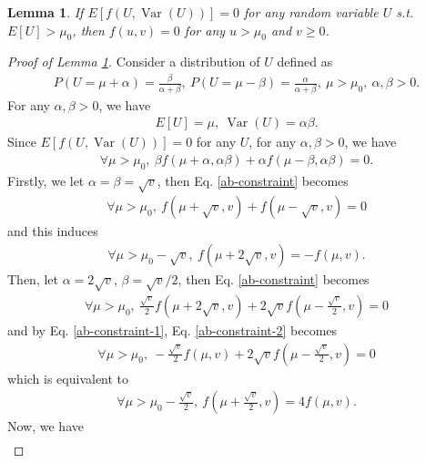 \documentclass[11pt]{article}
\theoremstyle{referenceplain}
\newtheorem{lemma}{Lemma}[section]
\theoremstyle{referencedefinition}
\theoremstyle{referenceremark}
\begin{document}
\begin{lemma}\label{lem: linear constraint}
    If $E[f(U,\operatorname{Var} (U))] = 0$ for any random variable $U$ s.t. $E[U]> \mu_0$, then $f(u,v) = 0$ for any $u>\mu_0$ and $v\ge 0$.
\end{lemma}
\begin{proof}[Proof of Lemma \ref{lem: linear constraint}]
    Consider a distribution of $U$ defined as 
    \begin{align*}
        P(U = \mu+\alpha) = \frac{\beta}{\alpha+\beta},~P(U = \mu-\beta) = \frac{\alpha}{\alpha+\beta},~\mu>\mu_0,~\alpha,\beta>0.
    \end{align*}
    For any $\alpha,\beta>0$, we have
    \begin{align*}
        E[U] = \mu,~\operatorname{Var}(U)=\alpha\beta.
    \end{align*}
    Since $E[f(U,\operatorname{Var} (U))] = 0$ for any $U$, for any $\alpha,\beta>0$, we have
    \begin{align}\label{ab-constraint}
       \forall\mu>\mu_0,~ \beta f(\mu+\alpha,\alpha\beta)+\alpha f(\mu-\beta,\alpha\beta)=0.
    \end{align}
    Firstly, we let $\alpha=\beta=\sqrt{v}$, then Eq. \eqref{ab-constraint} becomes
    \begin{align}
          \forall\mu>\mu_0,~  f(\mu+\sqrt{v},v)+f(\mu-\sqrt{v},v)=0
    \end{align}
    and this induces
    \begin{align}\label{ab-constraint-1}
          \forall\mu>\mu_0-\sqrt{v},~ f(\mu+2\sqrt{v},v) = -f(\mu,v).
    \end{align}
    Then, let $\alpha = 2\sqrt{v}$, $\beta=\sqrt{v}/2$, then Eq. \eqref{ab-constraint} becomes
    \begin{align}\label{ab-constraint-2}
        \forall\mu>\mu_0,~ \frac{\sqrt{v}}{2}f(\mu+2\sqrt{v},v)+2\sqrt{v}f(\mu - \frac{\sqrt{v}}{2},v)=0
    \end{align}
    and by Eq. \eqref{ab-constraint-1}, Eq. \eqref{ab-constraint-2} becomes
    \begin{align}
         \forall\mu>\mu_0,~ -\frac{\sqrt{v}}{2}f(\mu,v)+2\sqrt{v}f(\mu - \frac{\sqrt{v}}{2},v)=0
    \end{align}
    which is equivalent to
    \begin{align}\label{ab-constraint-3}
       \forall\mu>\mu_0-\frac{\sqrt{v}}{2},~ f(\mu+\frac{\sqrt{v}}{2},v) = 4 f(\mu,v).
    \end{align}
    Now, we have
    \begin{align}\label{ab-constraint-4}

\end{align}
\end{proof}
\end{document}
